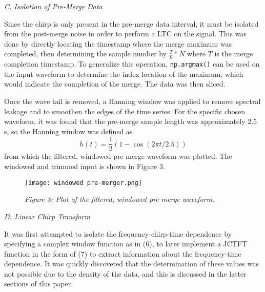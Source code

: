 \documentclass[12pt]{article}
\begin{document}
\begin{multicols}{2}
\begin{center}
    \textit{C. Isolation of Pre-Merge Data}\\
\end{center}

Since the chirp is only present in the pre-merge data interval, it must be isolated from the post-merge noise in order to perform a LTC on the signal. This was done by directly locating the timestamp where the merge maximum was completed, then determining the sample number by $\frac{T}{6}*N$ where $T$ is the merge completion timestamp. To generalize this operation, \verb!np.argmax()! can be used on the input waveform to determine the index location of the maximum, which would indicate the completion of the merge. The data was then sliced. 

Once the wave tail is removed, a Hanning window was applied to remove spectral leakage and to smoothen the edges of the time series. For the specific chosen waveform, it was found that the pre-merge sample length was approximately 2.5 s, so the Hanning window was defined as 
\[  
    h(t) = \frac{1}{2}(1 - \cos(2\pi t/ 2.5))\tag{10}
\]
from which the filtered, windowed pre-merge waveform was plotted. The windowed and trimmed input is shown in Figure 3.
\begin{figure}[H]
    \centering
    \texttt{[image: windowed pre-merger.png]}
    \caption*{\textit{Figure 3: Plot of the filtered, windowed pre-merge waveform.}}
\end{figure}


\begin{center}
    \textit{D. Linear Chirp Transform}\\
\end{center}

It was first attempted to isolate the frequency-chirp-time dependence by specifying a complex window function as in (6), to later implement a JCTFT function in the form of (7) to extract information about the frequency-time dependence. It was quickly discovered that the determination of these values was not possible due to the density of the data, and this is discussed in the latter sections of this paper. 


\end{multicols}
\end{document}
